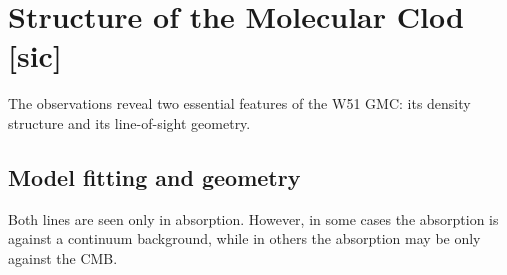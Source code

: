 



\section{Structure of the Molecular Clod [sic]}
The \formaldehyde observations reveal two essential features of the W51 GMC:
its density structure and its line-of-sight geometry.

\subsection{Model fitting and geometry}
Both \formaldehyde lines are seen only in absorption.  However, in some cases
the absorption is against a continuum background, while in others the
absorption may be only against the CMB.

